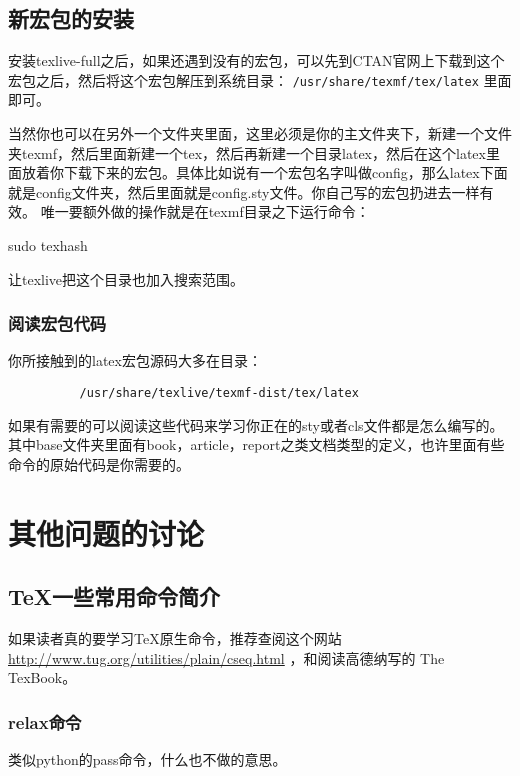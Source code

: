 \documentclass[11pt,oneside]{book}
\begin{document}
        \section{新宏包的安装}
        \label{sec-9}
        安装texlive-full之后，如果还遇到没有的宏包，可以先到CTAN官网上下载到这个宏包之后，然后将这个宏包解压到系统目录： \verb~/usr/share/texmf/tex/latex~ 里面即可。

        当然你也可以在另外一个文件夹里面，这里必须是你的主文件夹下，新建一个文件夹texmf，然后里面新建一个tex，然后再新建一个目录latex，然后在这个latex里面放着你下载下来的宏包。具体比如说有一个宏包名字叫做config，那么latex下面就是config文件夹，然后里面就是config.sty文件。你自己写的宏包扔进去一样有效。
        唯一要额外做的操作就是在texmf目录之下运行命令：
        \begin{tcbbash}
          sudo texhash
        \end{tcbbash}

        让texlive把这个目录也加入搜索范围。


        \subsection{阅读宏包代码}
        \label{sec-9-1}
        你所接触到的latex宏包源码大多在目录：
        \begin{Verbatim}
          /usr/share/texlive/texmf-dist/tex/latex
        \end{Verbatim}


        如果有需要的可以阅读这些代码来学习你正在的sty或者cls文件都是怎么编写的。其中base文件夹里面有book，article，report之类文档类型的定义，也许里面有些命令的原始代码是你需要的。




        \chapter{其他问题的讨论}

        \section{TeX一些常用命令简介}
        如果读者真的要学习TeX原生命令，推荐查阅这个网站 \href{http://www.tug.org/utilities/plain/cseq.html}{http://www.tug.org/utilities/plain/cseq.html} ，和阅读高德纳写的 The TexBook。

        \subsection{relax命令}
        类似python的pass命令，什么也不做的意思。
\end{document}
